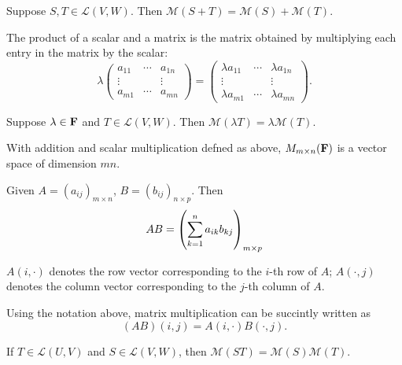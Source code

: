 \begin{proposition}
Suppose $S,T\in\mathcal{L}(V,W)$. Then $\mathcal{M}(S+T)=\mathcal{M}(S)+\mathcal{M}(T)$.
\end{proposition}

\begin{definition}
The product of a scalar and a matrix is the matrix obtained by multiplying each entry in the matrix by the scalar:
\[\lambda\begin{pmatrix}
a_{11}&\cdots&a_{1n}\\
\vdots&&\vdots\\
a_{m1}&\cdots&a_{mn}
\end{pmatrix}=
\begin{pmatrix}
\lambda a_{11}&\cdots&\lambda a_{1n}\\
\vdots&&\vdots\\
\lambda a_{m1}&\cdots&\lambda a_{mn}
\end{pmatrix}.\]
\end{definition}

\begin{proposition}
Suppose $\lambda\in\mathbf F$ and $T\in\mathcal{L}(V,W)$. Then $\mathcal{M}(\lambda T)=\lambda \mathcal{M}(T)$.
\end{proposition}

\begin{proposition}
With addition and scalar multiplication
defned as above, $M_{m\times n}(\mathbf F)$ is a vector space of dimension $mn$.
\end{proposition}

\begin{definition}
Given $A=(a_{ij})_{m\times n}$, $B=(b_{ij})_{n\times p}$. Then
\[AB=\left(\sum_{k=1}^{n}a_{ik}b_{kj}\right)_{m\times p}\]
\end{definition}

\begin{notation}
$A(i,\cdot)$ denotes the row vector corresponding to the $i$-th row of $A$; $A(\cdot,j)$ denotes the column vector corresponding to the $j$-th column of $A$.
\end{notation}

Using the notation above, matrix multiplication can be succintly written as
\[(AB)(i,j)=A(i,\cdot)B(\cdot,j).\]

\begin{proposition}
If $T\in\mathcal{L}(U,V)$ and $S\in\mathcal{L}(V,W)$, then $\mathcal{M}(ST)=\mathcal{M}(S)\mathcal{M}(T)$.
\end{proposition}

